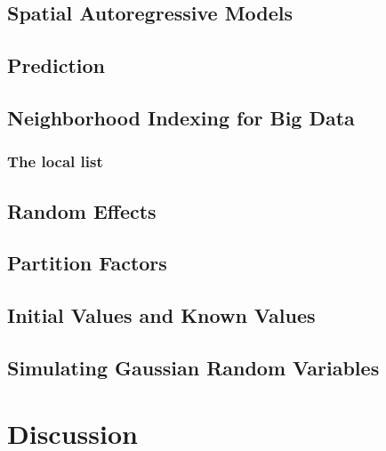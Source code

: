 \documentclass{article}
\begin{document}
\hypertarget{spatial-autoregressive-models}{%
\subsection{Spatial Autoregressive
Models}\label{spatial-autoregressive-models}}

\hypertarget{prediction}{%
\subsection{Prediction}\label{prediction}}

\hypertarget{neighborhood-indexing-for-big-data}{%
\subsection{Neighborhood Indexing for Big
Data}\label{neighborhood-indexing-for-big-data}}

\hypertarget{the-local-list}{%
\subsubsection{The local list}\label{the-local-list}}

\hypertarget{random-effects}{%
\subsection{Random Effects}\label{random-effects}}

\hypertarget{partition-factors}{%
\subsection{Partition Factors}\label{partition-factors}}

\hypertarget{initial-values-and-known-values}{%
\subsection{Initial Values and Known
Values}\label{initial-values-and-known-values}}

\hypertarget{simulating-gaussian-random-variables}{%
\subsection{Simulating Gaussian Random
Variables}\label{simulating-gaussian-random-variables}}

\hypertarget{discussion}{%
\section{Discussion}\label{discussion}}
\end{document}
